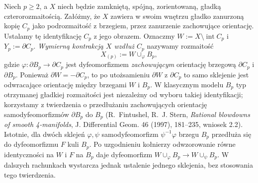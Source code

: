 \begin{definicja}
\label{def:tg-rb-operation}
Niech $p\geq2$, a $X$ niech będzie zamkniętą,
spójną, zorientowaną, gładką czterorozmaitością.
Załóżmy, że $X$ zawiera w swoim wnętrzu
gładko zanurzoną kopię $C_p$ jako podrozmaitość
z brzegiem, przez zanurzenie zachowujące orientację.
Ustalamy tę identyfikację $C_p$ z jego obrazem. Oznaczmy
$W:=X\setminus\operatorname{int}C_p$ i
$Y_p:=\partial C_p$.
\emph{Wymierną kontrakcją $X$ wzdłuż $C_p$}
nazywamy rozmaitość
\[
X_{(p)}:=W\cup_{\varphi}B_p,
\]
gdzie $\varphi:\partial B_p\to\partial C_p$ jest
dyfeomorfizmem \emph{zachowującym} orientację
brzegową $\partial C_p$ i $\partial B_p$.
Ponieważ $\partial W=-\partial C_p$, to po
utożsamieniu $\partial W$ z $\partial C_p$
to samo sklejenie jest odwracające orientację
między brzegami $W$ i $B_p$.
W klasycznym modelu $B_p$ typ otrzymanej
gładkiej rozmaitości jest niezależny od wyboru
takiej identyfikacji; korzystamy z twierdzenia
o przedłużaniu zachowujących orientację
samodyfeomorfizmów $\partial B_p$ do $B_p$
(R.~Fintushel, R.~J. Stern,
\emph{Rational blowdowns of smooth 4-manifolds},
J. Differential Geom. 46 (1997), 181--235, wniosek 2.2).
Istotnie, dla dwóch sklejeń $\varphi,\psi$
samodyfeomorfizm $\psi^{-1}\varphi$ brzegu $B_p$
przedłuża się do dyfeomorfizmu $F$ kuli $B_p$.
Po uzgodnieniu kołnierzy odwzorowanie równe
identyczności na $W$ i $F$ na $B_p$ daje
dyfeomorfizm $W\cup_\varphi B_p\to W\cup_\psi B_p$.
W dalszych rachunkach wystarcza jednak ustalenie
jednego sklejenia, bez stosowania tego twierdzenia.
\end{definicja}

\begin{center}
\end{center}

